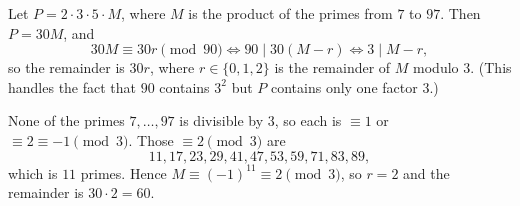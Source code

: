 Let $P=2\cdot3\cdot5\cdot M$, where $M$ is the product of the primes from $7$ to $97$. Then $P=30M$, and
\[
30M\equiv30r\pmod{90}\iff 90\mid30(M-r)\iff 3\mid M-r ,
\]
so the remainder is $30r$, where $r\in\{0,1,2\}$ is the remainder of $M$ modulo $3$. (This handles the fact that $90$ contains $3^2$ but $P$ contains only one factor $3$.)

None of the primes $7,\dots,97$ is divisible by $3$, so each is $\equiv1$ or $\equiv2\equiv-1\pmod3$. Those $\equiv2\pmod 3$ are
\[
11,17,23,29,41,47,53,59,71,83,89,
\]
which is $11$ primes. Hence $M\equiv(-1)^{11}\equiv2\pmod3$, so $r=2$ and the remainder is $30\cdot2=\boxed{60}$.

